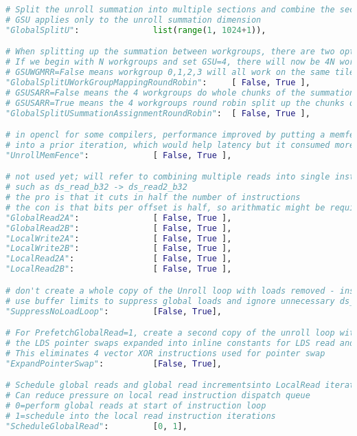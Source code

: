\documentclass[]{article}
\begin{document}
\begin{lstlisting}[language=python,breaklines=true]
# Split the unroll summation into multiple sections and combine the sections
# GSU applies only to the unroll summation dimension
"GlobalSplitU":               list(range(1, 1024+1)),

# When splitting up the summation between workgroups, there are two options for organizing which workgroup will do what
# If we begin with N workgroups and set GSU=4, there will now be 4N workgroups
# GSUWGMRR=False means workgroup 0,1,2,3 will all work on the same tile; =True means workgroup 0, N-1, 2N-1, 3N-1 will all work on the same tile
"GlobalSplitUWorkGroupMappingRoundRobin":     [ False, True ],
# GSUSARR=False means the 4 workgroups do whole chunks of the summation: k=0 -> K/4-1, k=K/4 -> 2K/4-1, k=2K/4 -> 3K/4-1, k=3K/4 -> 4K/4-1
# GSUSARR=True means the 4 workgroups round robin split up the chunks of the summation: k=0 -> DU-1, 4DU -> 5DU-1, ...; k=1DU -> 2DU-1, 5DU -> 6DU-1...; ...
"GlobalSplitUSummationAssignmentRoundRobin":  [ False, True ],

# in opencl for some compilers, performance improved by putting a memfence after each subiteration; it prevented the loads of one subiteration from being moved
# into a prior iteration, which would help latency but it consumed more vgprs which was a net loss
"UnrollMemFence":             [ False, True ],

# not used yet; will refer to combining multiple reads into single instruction
# such as ds_read_b32 -> ds_read2_b32
# the pro is that it cuts in half the number of instructions
# the con is that bits per offset is half, so arithmatic might be required to increment and reset offset vgprs
"GlobalRead2A":               [ False, True ],
"GlobalRead2B":               [ False, True ],
"LocalWrite2A":               [ False, True ],
"LocalWrite2B":               [ False, True ],
"LocalRead2A":                [ False, True ],
"LocalRead2B":                [ False, True ],

# don't create a whole copy of the Unroll loop with loads removed - instead
# use buffer limits to suppress global loads and ignore unnecessary ds_reads
"SuppressNoLoadLoop":         [False, True],

# For PrefetchGlobalRead=1, create a second copy of the unroll loop with
# the LDS pointer swaps expanded into inline constants for LDS read and write instructions
# This eliminates 4 vector XOR instructions used for pointer swap
"ExpandPointerSwap":          [False, True],

# Schedule global reads and global read incrementsinto LocalRead iterations
# Can reduce pressure on local read instruction dispatch queue
# 0=perform global reads at start of instruction loop
# 1=schedule into the local read instruction iterations
"ScheduleGlobalRead":         [0, 1],


\end{lstlisting}
\end{document}
